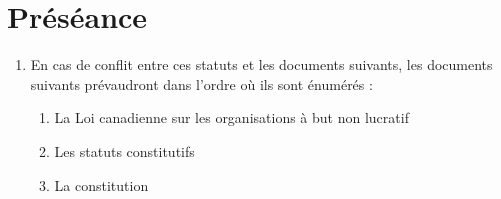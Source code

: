 \section{Préséance}
\label{preseance}

\begin{enumerate}
 \item En cas de conflit entre ces statuts et les documents suivants, les documents suivants prévaudront dans l'ordre où ils sont énumérés :
  \begin{enumerate}
   \item La Loi canadienne sur les organisations à but non lucratif
   \item Les statuts constitutifs
   \item La constitution
  \end{enumerate}
\end{enumerate}

